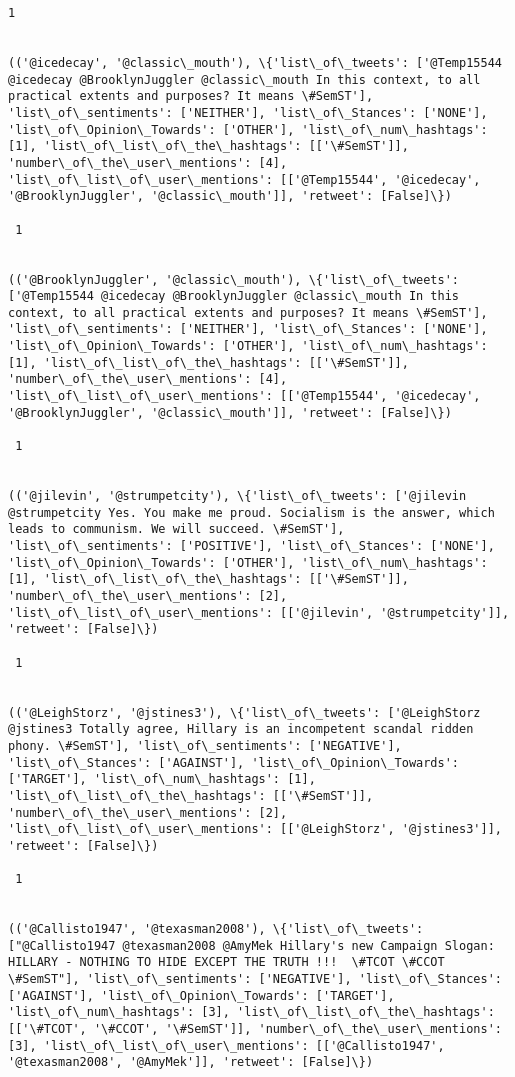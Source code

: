 \documentclass[11pt]{article}
\begin{document}
\begin{Verbatim}[commandchars=\\\{\}]
 1
 

(('@icedecay', '@classic\_mouth'), \{'list\_of\_tweets': ['@Temp15544 @icedecay @BrooklynJuggler @classic\_mouth In this context, to all practical extents and purposes? It means \#SemST'], 'list\_of\_sentiments': ['NEITHER'], 'list\_of\_Stances': ['NONE'], 'list\_of\_Opinion\_Towards': ['OTHER'], 'list\_of\_num\_hashtags': [1], 'list\_of\_list\_of\_the\_hashtags': [['\#SemST']], 'number\_of\_the\_user\_mentions': [4], 'list\_of\_list\_of\_user\_mentions': [['@Temp15544', '@icedecay', '@BrooklynJuggler', '@classic\_mouth']], 'retweet': [False]\})

 1
 

(('@BrooklynJuggler', '@classic\_mouth'), \{'list\_of\_tweets': ['@Temp15544 @icedecay @BrooklynJuggler @classic\_mouth In this context, to all practical extents and purposes? It means \#SemST'], 'list\_of\_sentiments': ['NEITHER'], 'list\_of\_Stances': ['NONE'], 'list\_of\_Opinion\_Towards': ['OTHER'], 'list\_of\_num\_hashtags': [1], 'list\_of\_list\_of\_the\_hashtags': [['\#SemST']], 'number\_of\_the\_user\_mentions': [4], 'list\_of\_list\_of\_user\_mentions': [['@Temp15544', '@icedecay', '@BrooklynJuggler', '@classic\_mouth']], 'retweet': [False]\})

 1
 

(('@jilevin', '@strumpetcity'), \{'list\_of\_tweets': ['@jilevin @strumpetcity Yes. You make me proud. Socialism is the answer, which leads to communism. We will succeed. \#SemST'], 'list\_of\_sentiments': ['POSITIVE'], 'list\_of\_Stances': ['NONE'], 'list\_of\_Opinion\_Towards': ['OTHER'], 'list\_of\_num\_hashtags': [1], 'list\_of\_list\_of\_the\_hashtags': [['\#SemST']], 'number\_of\_the\_user\_mentions': [2], 'list\_of\_list\_of\_user\_mentions': [['@jilevin', '@strumpetcity']], 'retweet': [False]\})

 1
 

(('@LeighStorz', '@jstines3'), \{'list\_of\_tweets': ['@LeighStorz @jstines3 Totally agree, Hillary is an incompetent scandal ridden phony. \#SemST'], 'list\_of\_sentiments': ['NEGATIVE'], 'list\_of\_Stances': ['AGAINST'], 'list\_of\_Opinion\_Towards': ['TARGET'], 'list\_of\_num\_hashtags': [1], 'list\_of\_list\_of\_the\_hashtags': [['\#SemST']], 'number\_of\_the\_user\_mentions': [2], 'list\_of\_list\_of\_user\_mentions': [['@LeighStorz', '@jstines3']], 'retweet': [False]\})

 1
 

(('@Callisto1947', '@texasman2008'), \{'list\_of\_tweets': ["@Callisto1947 @texasman2008 @AmyMek Hillary's new Campaign Slogan:  HILLARY - NOTHING TO HIDE EXCEPT THE TRUTH !!!  \#TCOT \#CCOT \#SemST"], 'list\_of\_sentiments': ['NEGATIVE'], 'list\_of\_Stances': ['AGAINST'], 'list\_of\_Opinion\_Towards': ['TARGET'], 'list\_of\_num\_hashtags': [3], 'list\_of\_list\_of\_the\_hashtags': [['\#TCOT', '\#CCOT', '\#SemST']], 'number\_of\_the\_user\_mentions': [3], 'list\_of\_list\_of\_user\_mentions': [['@Callisto1947', '@texasman2008', '@AmyMek']], 'retweet': [False]\})


\end{Verbatim}
\end{document}
